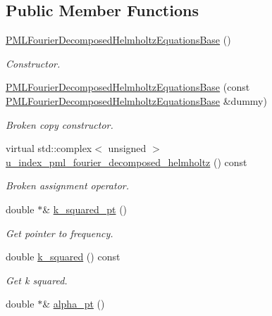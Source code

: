 \subsection*{Public Member Functions}
\begin{DoxyCompactItemize}
\item 
\hyperlink{classoomph_1_1PMLFourierDecomposedHelmholtzEquationsBase_a8c2a08cf1b53486545bfeab00867f54f}{P\+M\+L\+Fourier\+Decomposed\+Helmholtz\+Equations\+Base} ()
\begin{DoxyCompactList}\small\item\em Constructor. \end{DoxyCompactList}\item 
\hyperlink{classoomph_1_1PMLFourierDecomposedHelmholtzEquationsBase_ac589d96e7bcd971154cb843af0a48408}{P\+M\+L\+Fourier\+Decomposed\+Helmholtz\+Equations\+Base} (const \hyperlink{classoomph_1_1PMLFourierDecomposedHelmholtzEquationsBase}{P\+M\+L\+Fourier\+Decomposed\+Helmholtz\+Equations\+Base} \&dummy)
\begin{DoxyCompactList}\small\item\em Broken copy constructor. \end{DoxyCompactList}\item 
virtual std\+::complex$<$ unsigned $>$ \hyperlink{classoomph_1_1PMLFourierDecomposedHelmholtzEquationsBase_a7329e43f0e0762bf584d0bf7a99a3a67}{u\+\_\+index\+\_\+pml\+\_\+fourier\+\_\+decomposed\+\_\+helmholtz} () const
\begin{DoxyCompactList}\small\item\em Broken assignment operator. \end{DoxyCompactList}\item 
double $\ast$\& \hyperlink{classoomph_1_1PMLFourierDecomposedHelmholtzEquationsBase_acff93a080f34ba6ba819741aeb8b3631}{k\+\_\+squared\+\_\+pt} ()
\begin{DoxyCompactList}\small\item\em Get pointer to frequency. \end{DoxyCompactList}\item 
double \hyperlink{classoomph_1_1PMLFourierDecomposedHelmholtzEquationsBase_a1d3e7d3af49caa8403186ea912288cb2}{k\+\_\+squared} () const
\begin{DoxyCompactList}\small\item\em Get k squared. \end{DoxyCompactList}\item 
double $\ast$\& \hyperlink{classoomph_1_1PMLFourierDecomposedHelmholtzEquationsBase_a833a247658adaf73c89d2b2d49a9c058}{alpha\+\_\+pt} ()

\end{DoxyCompactItemize}

